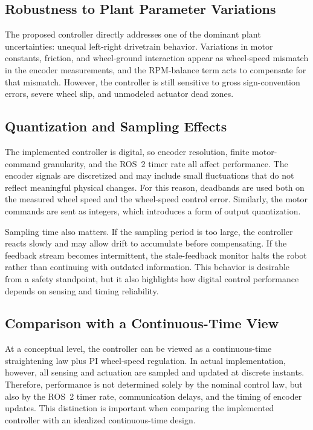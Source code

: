\documentclass[conference]{IEEEtran}
\begin{document}
\subsection{Robustness to Plant Parameter Variations}
The proposed controller directly addresses one of the dominant plant uncertainties: unequal left-right drivetrain behavior. Variations in motor constants, friction, and wheel-ground interaction appear as wheel-speed mismatch in the encoder measurements, and the RPM-balance term acts to compensate for that mismatch. However, the controller is still sensitive to gross sign-convention errors, severe wheel slip, and unmodeled actuator dead zones.

\subsection{Quantization and Sampling Effects}
The implemented controller is digital, so encoder resolution, finite motor-command granularity, and the ROS~2 timer rate all affect performance. The encoder signals are discretized and may include small fluctuations that do not reflect meaningful physical changes. For this reason, deadbands are used both on the measured wheel speed and the wheel-speed control error. Similarly, the motor commands are sent as integers, which introduces a form of output quantization.

Sampling time also matters. If the sampling period is too large, the controller reacts slowly and may allow drift to accumulate before compensating. If the feedback stream becomes intermittent, the stale-feedback monitor halts the robot rather than continuing with outdated information. This behavior is desirable from a safety standpoint, but it also highlights how digital control performance depends on sensing and timing reliability.

\subsection{Comparison with a Continuous-Time View}
At a conceptual level, the controller can be viewed as a continuous-time straightening law plus PI wheel-speed regulation. In actual implementation, however, all sensing and actuation are sampled and updated at discrete instants. Therefore, performance is not determined solely by the nominal control law, but also by the ROS~2 timer rate, communication delays, and the timing of encoder updates. This distinction is important when comparing the implemented controller with an idealized continuous-time design.
\end{document}
